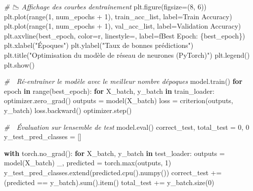 \documentclass[
  letterpaper,
  DIV=11,
  numbers=noendperiod]{scrartcl}
\newenvironment{Shaded}{}{}
\newcommand{\BuiltInTok}[1]{\textcolor[rgb]{0.00,0.50,0.00}{#1}}
\newcommand{\CommentTok}[1]{\textcolor[rgb]{0.38,0.63,0.69}{\textit{#1}}}
\newcommand{\ControlFlowTok}[1]{\textcolor[rgb]{0.00,0.44,0.13}{\textbf{#1}}}
\newcommand{\DecValTok}[1]{\textcolor[rgb]{0.25,0.63,0.44}{#1}}
\newcommand{\KeywordTok}[1]{\textcolor[rgb]{0.00,0.44,0.13}{\textbf{#1}}}
\newcommand{\NormalTok}[1]{#1}
\newcommand{\OperatorTok}[1]{\textcolor[rgb]{0.40,0.40,0.40}{#1}}
\newcommand{\SpecialCharTok}[1]{\textcolor[rgb]{0.25,0.44,0.63}{#1}}
\newcommand{\SpecialStringTok}[1]{\textcolor[rgb]{0.73,0.40,0.53}{#1}}
\newcommand{\StringTok}[1]{\textcolor[rgb]{0.25,0.44,0.63}{#1}}
\begin{document}
\begin{Shaded}
\begin{Highlighting}[]
\CommentTok{\# 📉 Affichage des courbes d\textquotesingle{}entraînement}
\NormalTok{plt.figure(figsize}\OperatorTok{=}\NormalTok{(}\DecValTok{8}\NormalTok{, }\DecValTok{6}\NormalTok{))}
\NormalTok{plt.plot(}\BuiltInTok{range}\NormalTok{(}\DecValTok{1}\NormalTok{, num\_epochs }\OperatorTok{+} \DecValTok{1}\NormalTok{), train\_acc\_list, label}\OperatorTok{=}\StringTok{\textquotesingle{}Train Accuracy\textquotesingle{}}\NormalTok{)}
\NormalTok{plt.plot(}\BuiltInTok{range}\NormalTok{(}\DecValTok{1}\NormalTok{, num\_epochs }\OperatorTok{+} \DecValTok{1}\NormalTok{), val\_acc\_list, label}\OperatorTok{=}\StringTok{\textquotesingle{}Validation Accuracy\textquotesingle{}}\NormalTok{)}
\NormalTok{plt.axvline(best\_epoch, color}\OperatorTok{=}\StringTok{\textquotesingle{}r\textquotesingle{}}\NormalTok{, linestyle}\OperatorTok{=}\StringTok{\textquotesingle{}{-}{-}\textquotesingle{}}\NormalTok{, label}\OperatorTok{=}\SpecialStringTok{f\textquotesingle{}Best Epoch: }\SpecialCharTok{\{}\NormalTok{best\_epoch}\SpecialCharTok{\}}\SpecialStringTok{\textquotesingle{}}\NormalTok{)}
\NormalTok{plt.xlabel(}\StringTok{"Époques"}\NormalTok{)}
\NormalTok{plt.ylabel(}\StringTok{"Taux de bonnes prédictions"}\NormalTok{)}
\NormalTok{plt.title(}\StringTok{"Optimisation du modèle de réseau de neurones (PyTorch)"}\NormalTok{)}
\NormalTok{plt.legend()}
\NormalTok{plt.show()}

\CommentTok{\# 🔄 Ré{-}entraîner le modèle avec le meilleur nombre d\textquotesingle{}époques}
\NormalTok{model.train()}
\ControlFlowTok{for}\NormalTok{ epoch }\KeywordTok{in} \BuiltInTok{range}\NormalTok{(best\_epoch):}
    \ControlFlowTok{for}\NormalTok{ X\_batch, y\_batch }\KeywordTok{in}\NormalTok{ train\_loader:}
\NormalTok{        optimizer.zero\_grad()}
\NormalTok{        outputs }\OperatorTok{=}\NormalTok{ model(X\_batch)}
\NormalTok{        loss }\OperatorTok{=}\NormalTok{ criterion(outputs, y\_batch)}
\NormalTok{        loss.backward()}
\NormalTok{        optimizer.step()}

\CommentTok{\# 🎯 Évaluation sur l\textquotesingle{}ensemble de test}
\NormalTok{model.}\BuiltInTok{eval}\NormalTok{()}
\NormalTok{correct\_test, total\_test }\OperatorTok{=} \DecValTok{0}\NormalTok{, }\DecValTok{0}
\NormalTok{y\_test\_pred\_classes }\OperatorTok{=}\NormalTok{ []}

\ControlFlowTok{with}\NormalTok{ torch.no\_grad():}
    \ControlFlowTok{for}\NormalTok{ X\_batch, y\_batch }\KeywordTok{in}\NormalTok{ test\_loader:}
\NormalTok{        outputs }\OperatorTok{=}\NormalTok{ model(X\_batch)}
\NormalTok{        \_, predicted }\OperatorTok{=}\NormalTok{ torch.}\BuiltInTok{max}\NormalTok{(outputs, }\DecValTok{1}\NormalTok{)}
\NormalTok{        y\_test\_pred\_classes.extend(predicted.cpu().numpy())}
\NormalTok{        correct\_test }\OperatorTok{+=}\NormalTok{ (predicted }\OperatorTok{==}\NormalTok{ y\_batch).}\BuiltInTok{sum}\NormalTok{().item()}
\NormalTok{        total\_test }\OperatorTok{+=}\NormalTok{ y\_batch.size(}\DecValTok{0}\NormalTok{)}


\end{Highlighting}
\end{Shaded}
\end{document}
